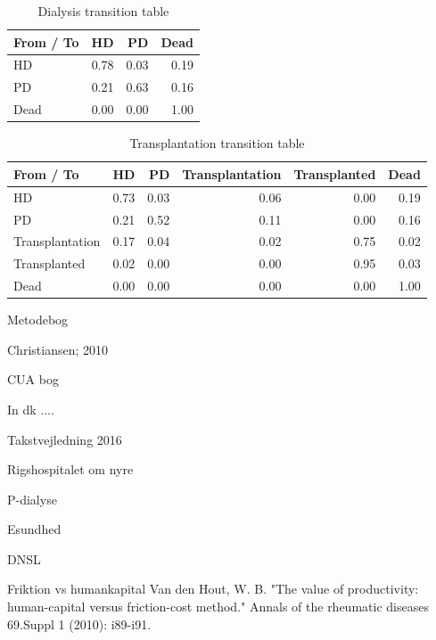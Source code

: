 \documentclass[a4paper,12pt]{article}
\begin{document}
\begin{table}[ht]
	\centering
	\caption{Dialysis transition table} 
		\begin{tabular}{l|rrr}
			\hline
			From / To & HD & PD & Dead \\ 
			\hline
			\hline
			HD & 0.78 & 0.03 & 0.19 \\ 
			PD & 0.21 & 0.63 & 0.16 \\ 
			Dead & 0.00 & 0.00 & 1.00 \\ 
			\hline
		\end{tabular}
\end{table}



\begin{table}[ht]
	\centering
	\caption{Transplantation transition table} 
	\begin{tabular}{l|rrrrr}
		\hline
		From / To & HD & PD & Transplantation & Transplanted & Dead \\ 
		\hline
		\hline
		HD & 0.73 & 0.03 & 0.06 & 0.00 & 0.19 \\ 
		PD & 0.21 & 0.52 & 0.11 & 0.00 & 0.16 \\ 
		Transplantation & 0.17 & 0.04 & 0.02 & 0.75 & 0.02 \\ 
		Transplanted & 0.02 & 0.00 & 0.00 & 0.95 & 0.03 \\ 
		Dead & 0.00 & 0.00 & 0.00 & 0.00 & 1.00 \\ 
		\hline
	\end{tabular}
\end{table}






\newpage

\begin{thebibliography}{9}

Metodebog

Christiansen; 2010

CUA bog

In dk .... 

Takstvejledning 2016

Rigshospitalet om nyre

P-dialyse

Esundhed

DNSL

Friktion vs humankapital
Van den Hout, W. B. "The value of productivity: human-capital versus friction-cost method." Annals of the rheumatic diseases 69.Suppl 1 (2010): i89-i91.

\end{thebibliography}	
	
\end{document}

